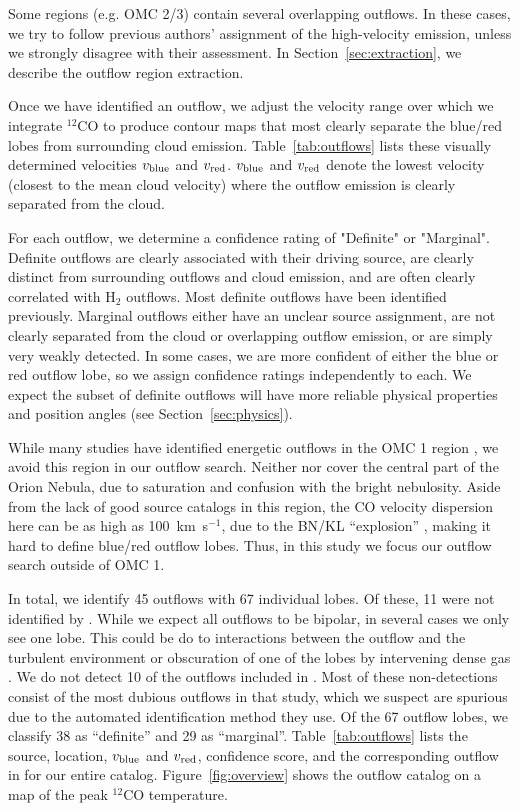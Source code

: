 \documentclass[twocolumn]{aastex63}
\newcommand{\co}[1][]{\ensuremath{^{#1}}CO}
\begin{document}
Some regions (e.g. OMC 2/3) contain several overlapping outflows. In these cases, we try to follow previous authors' assignment of the high-velocity emission, unless we strongly disagree with their assessment. In Section~\ref{sec:extraction}, we describe the outflow region extraction.

Once we have identified an outflow, we adjust the velocity range over which we integrate \co[12]{} to produce contour maps that most clearly separate the blue/red lobes from surrounding cloud emission. Table~\ref{tab:outflows} lists these visually determined velocities $v_{\rm blue}$ and $v_{\rm red}$. $v_{\rm blue}$ and $v_{\rm red}$ denote the lowest velocity (closest to the mean cloud velocity) where the outflow emission is clearly separated from the cloud. 

For each outflow, we determine a confidence rating of "Definite" or "Marginal". Definite outflows are clearly associated with their driving source, are clearly distinct from surrounding outflows and cloud emission, and are often clearly correlated with H$_2$ outflows. Most definite outflows have been identified previously. Marginal outflows either have an unclear source assignment, are not clearly separated from the cloud or overlapping outflow emission, or are simply very weakly detected. In some cases, we are more confident of either the blue or red outflow lobe, so we assign confidence ratings independently to each. We expect the subset of definite outflows will have more reliable physical properties and position angles (see Section~\ref{sec:physics}).

While many studies have identified energetic outflows in the OMC 1 region \citep[e.g.][]{Schmid-Burgk90,Zapata05,Teixeira16,Bally17}, we avoid this region in our outflow search. Neither \citet{Davis09} nor \citet{Furlan16} cover the central part of the Orion Nebula, due to saturation and confusion with the bright nebulosity. Aside from the lack of good source catalogs in this region, the CO velocity dispersion here can be as high as 100~km~s$^{-1}$, due to the BN/KL ``explosion'' \citep{Bally17}, making it hard to define blue/red outflow lobes. Thus, in this study we focus our outflow search outside of OMC 1. 

In total, we identify 45 outflows with 67 individual lobes. Of these, 11 were not identified by \citet{Tanabe:submitted}. While we expect all outflows to be bipolar, in several cases we only see one lobe. This could be do to interactions between the outflow and the turbulent environment or obscuration of one of the lobes by intervening dense gas \citep{Offner11}. We do not detect 10 of the outflows included in \citet{Tanabe:submitted}. Most of these non-detections consist of the most dubious outflows in that study, which we suspect are spurious due to the automated identification method they use. Of the 67 outflow lobes, we classify 38 as ``definite'' and 29 as ``marginal''. Table~\ref{tab:outflows} lists the source, location, $v_{\rm blue}$ and $v_{\rm red}$, confidence score, and the corresponding outflow in \citet{Tanabe:submitted} for our entire catalog. Figure~\ref{fig:overview} shows the outflow catalog on a map of the peak \co[12]{} temperature.
\end{document}
